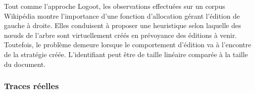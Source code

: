 \noindent Tout comme l'approche Logoot, les observations effectuées sur un
corpus Wikipédia montre l'importance d'une fonction d'allocation gérant
l'édition de gauche à droite. Elles conduisent à proposer une heuristique selon
laquelle des nœuds de l'arbre sont virtuellement créés en prévoyance des
éditions à venir. Toutefois, le problème demeure lorsque le comportement
d'édition va à l'encontre de la stratégie créée. L'identifiant peut être de
taille linéaire comparée à la taille du document.




\subsubsection{Traces réelles}

